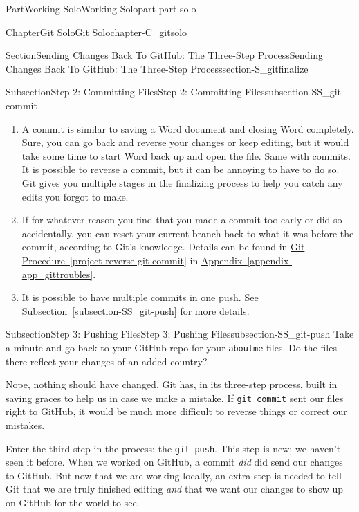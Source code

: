 \documentclass[oneside,10pt,]{book}
\newcommand{\xreffont}{\relax}
\newcommand{\mono}[1]{\texttt{#1}}
\begin{document}
\begin{partptx}{Part}{Working Solo}{}{Working Solo}{}{}{part-part-solo}
\begin{chapterptx}{Chapter}{Git Solo}{}{Git Solo}{}{}{chapter-C_gitsolo}
\begin{sectionptx}{Section}{Sending Changes Back To GitHub: The Three-Step Process}{}{Sending Changes Back To GitHub: The Three-Step Process}{}{}{section-S_gitfinalize}
\begin{subsectionptx}{Subsection}{Step 2: Committing Files}{}{Step 2: Committing Files}{}{}{subsection-SS_git-commit}
\begin{enumerate}
\item{}A commit is similar to saving a Word document and closing Word completely. Sure, you can go back and reverse your changes or keep editing, but it would take some time to start Word back up and open the file. Same with commits. It is possible to reverse a commit, but it can be annoying to have to do so. Git gives you multiple stages in the finalizing process to help you catch any edits you forgot to make.%
\item{}If for whatever reason you find that you made a commit too early or did so accidentally, you can reset your current branch back to what it was before the commit, according to Git's knowledge. Details can be found in \hyperref[project-reverse-git-commit]{Git Procedure~{\xreffont\ref{project-reverse-git-commit}}} in \hyperref[appendix-app_gittroubles]{Appendix~{\xreffont\ref{appendix-app_gittroubles}}}.%
\item{}It is possible to have multiple commits in one push. See \hyperref[subsection-SS_git-push]{Subsection~{\xreffont\ref{subsection-SS_git-push}}} for more details.%
\end{enumerate}
%
\end{subsectionptx}
%
%
\typeout{************************************************}
\typeout{************************************************}
%
\begin{subsectionptx}{Subsection}{Step 3: Pushing Files}{}{Step 3: Pushing Files}{}{}{subsection-SS_git-push}
%
%
%
%
%
%
Take a minute and go back to your GitHub repo for your \mono{aboutme} files. Do the files there reflect your changes of an added country?%
\par
Nope, nothing should have changed. Git has, in its three-step process, built in saving graces to help us in case we make a mistake. If \mono{git commit} sent our files right to GitHub, it would be much more difficult to reverse things or correct our mistakes.%
\par
Enter the third step in the process: the \mono{git push}. This step is new; we haven't seen it before. When we worked on GitHub, a commit \emph{did} did send our changes to GitHub. But now that we are working locally, an extra step is needed to tell Git that we are truly finished editing \emph{and} that we want our changes to show up on GitHub for the world to see.%
\par

\end{subsectionptx}
\end{sectionptx}
\end{chapterptx}
\end{partptx}
\end{document}
